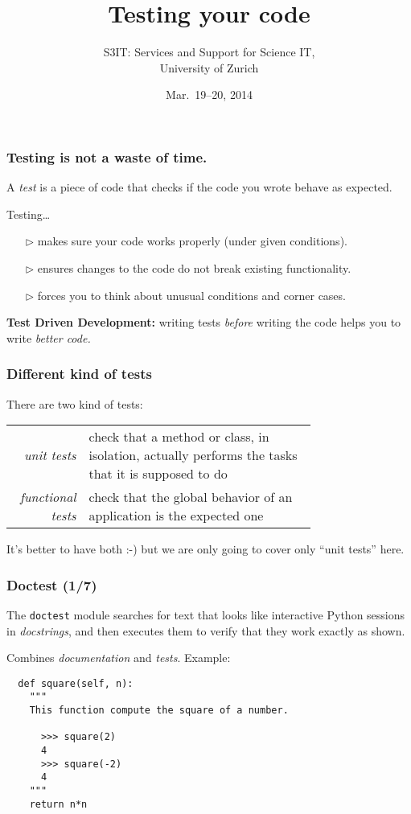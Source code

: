 \documentclass[english,serif,mathserif,xcolor=pdftex,dvipsnames,table]{beamer}
\title[Testing]{%
  Testing your code
}
\author[S3IT]{%
  S3IT: Services and Support for Science IT, \\
  University of Zurich
}
\date{Mar.~19--20, 2014}
\begin{document}
\maketitle


\begin{frame}
  \frametitle{Testing is \textbf{not} a waste of time.}
  A \emph{test} is a piece of code that checks if the code you
  wrote behave as expected.

  \+
  Testing\ldots
  \begin{itemize}
  \item[$\triangleright$] makes sure your code works properly (under given conditions).
  \item[$\triangleright$] ensures changes to the code do not break existing functionality.
  \item[$\triangleright$] forces you to think about unusual conditions and corner cases.
  \end{itemize}

  \+ \textbf{Test Driven Development:} writing tests \textit{before}
  writing the code helps you to write \emph{better code.}
\end{frame}


\begin{frame}
  \frametitle{Different kind of tests}

  There are two kind of tests:

  \+
  \begin{tabular}{>{\em}r>{\raggedright}p{0.75\linewidth}}
    unit tests
    &
    check that a method or class, in isolation,
    actually performs the tasks that it is supposed to do
    \\
    functional tests
    &
    check that the global behavior of an application is the expected one
    \\
  \end{tabular}

  \+
  It's better to have both :-) but we are only going to cover
  only ``unit tests'' here.
\end{frame}


\begin{frame}[fragile]
  \frametitle{Doctest (1/7)}

  The \lstinline|doctest| module searches for text that looks like
  interactive Python sessions in \textit{docstrings}, and then
  executes them to verify that they work exactly as shown.

  \+
  Combines \textit{documentation} and \textit{tests}. Example:
  \begin{lstlisting}
  def square(self, n):
    """
    This function compute the square of a number.

      >>> square(2)
      4
      >>> square(-2)
      4
    """
    return n*n
  \end{lstlisting}
\end{frame}
\end{document}
